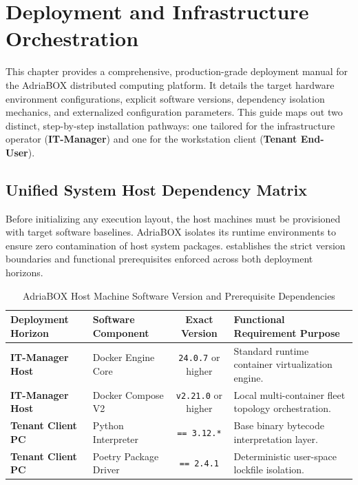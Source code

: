 \section{Deployment and Infrastructure Orchestration}
\label{sec:deployment}

This chapter provides a comprehensive, production-grade deployment manual for the AdriaBOX distributed computing platform. It details the target hardware environment configurations, explicit software versions, dependency isolation mechanics, and externalized configuration parameters. This guide maps out two distinct, step-by-step installation pathways: one tailored for the infrastructure operator (\textbf{IT-Manager}) and one for the workstation client (\textbf{Tenant End-User}).

\subsection{Unified System Host Dependency Matrix}
Before initializing any execution layout, the host machines must be provisioned with target software baselines. AdriaBOX isolates its runtime environments to ensure zero contamination of host system packages.  establishes the strict version boundaries and functional prerequisites enforced across both deployment horizons.

\begin{table}[htbp]
\small
\centering
\caption{AdriaBOX Host Machine Software Version and Prerequisite Dependencies}
\label{tab:detailed_versions}
\vspace{2mm}
\begin{tabularx}{\textwidth}{|l|l|c|X|}
\hline
\textbf{Deployment Horizon} & \textbf{Software Component} & \textbf{Exact Version} & \textbf{Functional Requirement Purpose} \\ \hline
\textbf{IT-Manager Host} & Docker Engine Core & \texttt{24.0.7} or higher & Standard runtime container virtualization engine. \\ \hline
\textbf{IT-Manager Host} & Docker Compose V2 & \texttt{v2.21.0} or higher & Local multi-container fleet topology orchestration. \\ \hline
\textbf{Tenant Client PC} & Python Interpreter & \texttt{== 3.12.*} & Base binary bytecode interpretation layer. \\ \hline
\textbf{Tenant Client PC} & Poetry Package Driver & \texttt{== 2.4.1} & Deterministic user-space lockfile isolation. \\ \hline
\end{tabularx}
\end{table}

